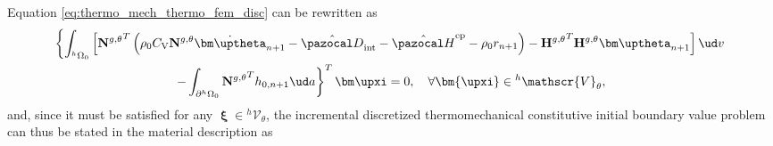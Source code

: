 Equation \eqref{eq:thermo_mech_thermo_fem_disc} can be rewritten as
\begin{multline}
  \left\{\int_{^h\Omega_0}   \left[{\mathbf N^{g,\theta}}^T \left(\rho_0C_\mathrm{V}\mathbf N^{g,\theta}\dot{\bm \uptheta}_{n+1} -\hat{\pazocal D}_\text{int} - \hat{\pazocal H}^\text{ep}- \rho_0 r_{n+1} \right) - {\mathbf H^{g,\theta}}^T\mathbf H^{g,\theta} {\bm\uptheta}_{n+1} \right]\ud v\right. \\ \left.- \int_{\partial{}^h\Omega_0} {\mathbf N^{g,\theta}}^T h_{0,n+1}\ud a\right\}^T \bm \upxi= 0,\quad \forall \bm{\upxi} \in {}^h\mathscr{V}_{\theta}, \label{eq:thermo_mech_thermo_fem_disc}
\end{multline}
and, since it must be satisfied for any $\bm \upxi \in {}^h \mathscr{V}_\theta$, the incremental discretized thermomechanical constitutive initial boundary value problem can thus be stated in the material description as
